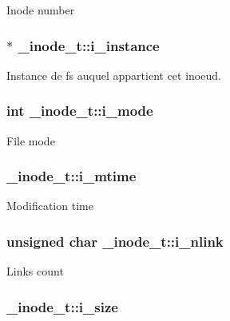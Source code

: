Inode number \hypertarget{struct__inode__t_affefc88b22f45e2ec8340d582486d0f2}{
\subsubsection[{i\-\_\-instance}]{$\ast$ \-\_\-inode\-\_\-t\-::i\-\_\-instance}}\label{struct__inode__t_affefc88b22f45e2ec8340d582486d0f2}
Instance de fs auquel appartient cet inoeud. \hypertarget{struct__inode__t_acead4732b6c22ef17ada59203509e728}{
\subsubsection[{i\-\_\-mode}]{\setlength{\rightskip}{0pt plus 5cm}int \-\_\-inode\-\_\-t\-::i\-\_\-mode}}\label{struct__inode__t_acead4732b6c22ef17ada59203509e728}
File mode \hypertarget{struct__inode__t_a331d724391efce2f89aeb1a503ae5c43}{
\subsubsection[{i\-\_\-mtime}]{ \-\_\-inode\-\_\-t\-::i\-\_\-mtime}}\label{struct__inode__t_a331d724391efce2f89aeb1a503ae5c43}
Modification time \hypertarget{struct__inode__t_a929fc1e6837d02a2525027a121b4e67e}{
\subsubsection[{i\-\_\-nlink}]{\setlength{\rightskip}{0pt plus 5cm}unsigned char \-\_\-inode\-\_\-t\-::i\-\_\-nlink}}\label{struct__inode__t_a929fc1e6837d02a2525027a121b4e67e}
Links count \hypertarget{struct__inode__t_aed37b31c96c90873201abfc8b4b3e463}{
\subsubsection[{i\-\_\-size}]{ \-\_\-inode\-\_\-t\-::i\-\_\-size}}\label{struct__inode__t_aed37b31c96c90873201abfc8b4b3e463}
